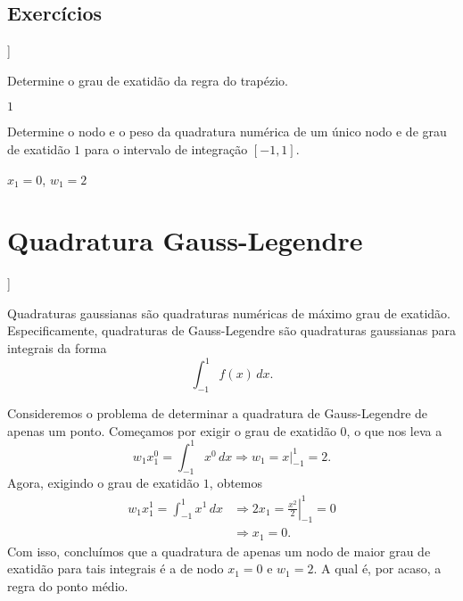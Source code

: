 \subsection*{Exercícios}

\begin{flushleft}
  [[tag:revisar]]
\end{flushleft}

\begin{exer}
  Determine o grau de exatidão da regra do trapézio.
\end{exer}
\begin{resp}
  $1$
\end{resp}

\begin{exer}
  Determine o nodo e o peso da quadratura numérica de um único nodo e de grau de exatidão $1$ para o intervalo de integração $[-1, 1]$.
\end{exer}
\begin{resp}
  $x_1=0$, $w_1=2$
\end{resp}

\section{Quadratura Gauss-Legendre}\label{cap_integr_sec_Gauss-Legendre}

\begin{flushleft}
  [[tag:revisar]]
\end{flushleft}

Quadraturas gaussianas são quadraturas numéricas de máximo grau de exatidão. Especificamente, quadraturas de Gauss-Legendre são quadraturas gaussianas para integrais da forma
\begin{equation}
  \int_{-1}^1 f(x)\,dx.
\end{equation}

Consideremos o problema de determinar a quadratura de Gauss-Legendre de apenas um ponto. Começamos por exigir o grau de exatidão $0$, o que nos leva a
\begin{equation}
  w_1x_1^0 = \int_{-1}^1 x^0\,dx \Rightarrow w_1 = x|_{-1}^1 = 2.
\end{equation}
Agora, exigindo o grau de exatidão $1$, obtemos
\begin{align}
  w_1x_1^1 = \int_{-1}^1 x^1\,dx &\Rightarrow 2x_1 = \left.\frac{x^2}{2}\right|_{-1}^1 = 0\\
  &\Rightarrow x_1=0.
\end{align}
Com isso, concluímos que a quadratura de apenas um nodo de maior grau de exatidão para tais integrais é a de nodo $x_1=0$ e $w_1=2$. A qual é, por acaso, a regra do ponto médio.


